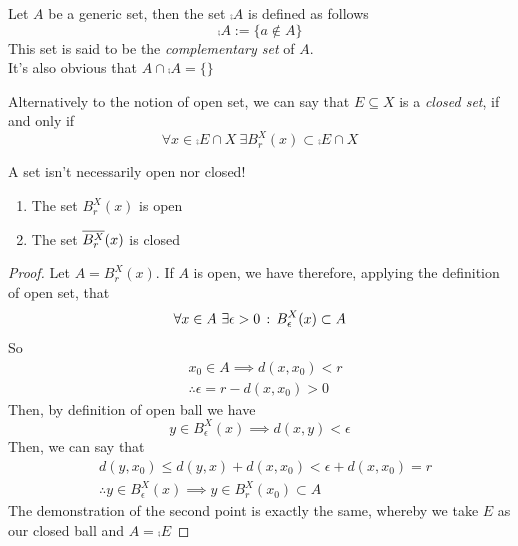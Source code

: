 \documentclass[../complete.tex]{subfiles}
\begin{document}
\begin{dfn}
	Let $A$ be a generic set, then the set $\comp{A}$ is defined as follows
	\begin{equation}
		\comp{A}:=\{a\notin A\}
		\label{eq:compsetdef}
	\end{equation}
	This set is said to be the \textit{complementary set} of $A$.\\
	It's also obvious that $A\cap\comp{A}=\{\}$
\end{dfn}
\begin{dfn}
	Alternatively to the notion of open set, we can say that $E\subseteq X$ is a \textit{closed set}, if and only if
	\begin{equation}
		\forall x\in\comp{E}\cap X\ \exists B_r^X(x)\subset\comp{E}\cap X
		\label{eq:closedsetdef}
	\end{equation}
\end{dfn}
\begin{rmk}
	A set isn't necessarily open nor closed!
\end{rmk}
\begin{prop}
	\begin{enumerate}
	\item The set $B_r^X(x)$ is open
	\item The set $\overline{B_r^X}(x)$ is closed
	\end{enumerate}
\end{prop}
\begin{proof}
	Let $A=B_r^X(x)$. If $A$ is open, we have therefore, applying the definition of open set, that
	\begin{equation*}
		\forall x\in A\ \exists\epsilon>0\, :\,  B^X_\epsilon(x)\subset A
	\end{equation*}
	So
	\begin{equation*}
		\begin{aligned}
			&x_0\in A\implies{} d(x,x_0)<r\\
			&\therefore\epsilon=r-d(x,x_0)>0
		\end{aligned}
	\end{equation*}
	Then, by definition of open ball we have
	\begin{equation*}
		y\in B^X_\epsilon(x)\implies{} d(x,y)<\epsilon
	\end{equation*}
	Then, we can say that
	\begin{equation*}
		\begin{aligned}
			&d(y,x_0)\le d(y,x)+d(x,x_0)<\epsilon+d(x,x_0)=r\\
			&\therefore y\in B^X_\epsilon(x)\implies{} y\in B^X_r(x_0)\subset A
		\end{aligned}
	\end{equation*}
	The demonstration of the second point is exactly the same, whereby we take $E$ as our closed ball and $A=\comp{E}$
\end{proof}
\end{document}

